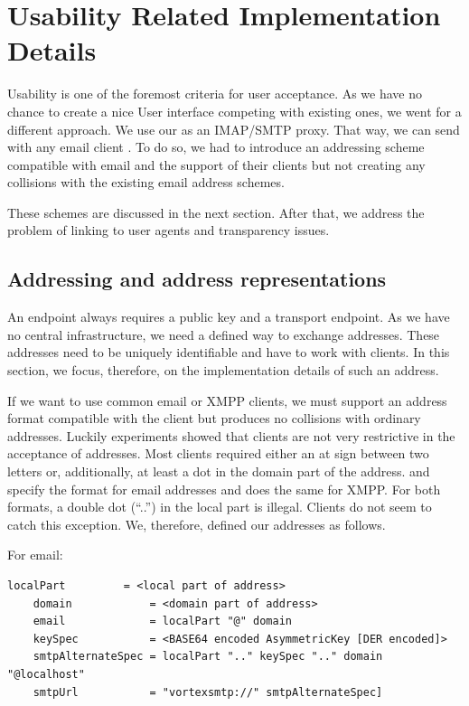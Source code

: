 \chapter{Usability Related Implementation Details}\label{sec:usabilityImplementation}
Usability is one of the foremost criteria for user acceptance. As we have no chance to create a nice User interface competing with existing ones, we went for a different approach. We use our \VortexNode{} as an IMAP/SMTP proxy. That way, we can send with any email client \VortexMessages. To do so, we had to introduce an addressing scheme compatible with email and the support of their clients but not creating any collisions with the existing email address schemes.

These schemes are discussed in the next section. After that, we address the problem of linking to user agents and transparency issues.

\section{Addressing and address representations}
An endpoint always requires a public key and a transport endpoint. As we have no central infrastructure, we need a defined way to exchange addresses. These addresses need to be uniquely identifiable and have to work with clients. In this section, we focus, therefore, on the implementation details of such an address.

If we want to use common email or XMPP clients, we must support an address format compatible with the client but produces no collisions with ordinary addresses. Luckily experiments showed that clients are not very restrictive in the acceptance of addresses. Most clients required either an at sign between two letters or, additionally, at least a dot in the domain part of the address. \cite{rfc5321} and \cite{rfc5322} specify the format for email addresses and \cite{rfc6120} does the same for XMPP. For both formats, a double dot (``..'') in the local part is illegal. Clients do not seem to catch this exception. We, therefore, defined our addresses as follows.


For email:
\begin{lstlisting}[language=EBNF]
	localPart         = <local part of address>
	domain            = <domain part of address>
	email             = localPart "@" domain
	keySpec           = <BASE64 encoded AsymmetricKey [DER encoded]>
	smtpAlternateSpec = localPart ".." keySpec ".." domain "@localhost"
	smtpUrl           = "vortexsmtp://" smtpAlternateSpec]
\end{lstlisting}

